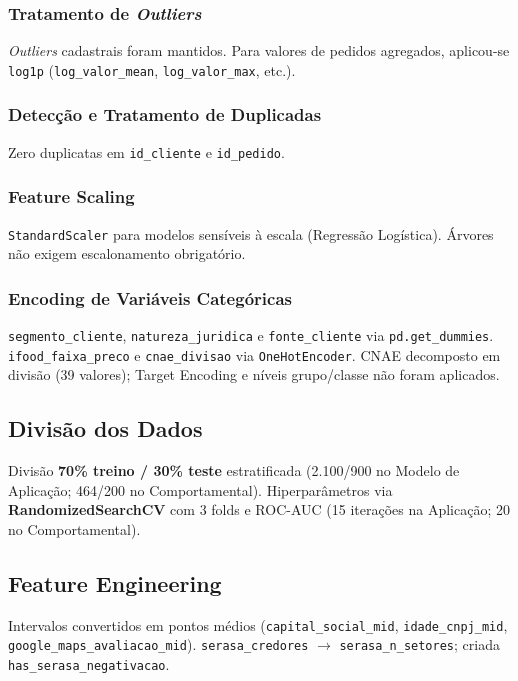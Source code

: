 \documentclass[conference]{IEEEtran}
\newcommand{\code}[1]{\texttt{#1}}
\begin{document}
\subsubsection{Tratamento de \textit{Outliers}}

\textit{Outliers} cadastrais foram mantidos. Para valores de pedidos agregados, aplicou-se \code{log1p} (\code{log\_valor\_mean}, \code{log\_valor\_max}, etc.).

\subsubsection{Detecção e Tratamento de Duplicadas}

Zero duplicatas em \code{id\_cliente} e \code{id\_pedido}.

\subsubsection{Feature Scaling}

\code{StandardScaler} para modelos sensíveis à escala (Regressão Logística). Árvores não exigem escalonamento obrigatório.

\subsubsection{Encoding de Variáveis Categóricas}

\code{segmento\_cliente}, \code{natureza\_juridica} e \code{fonte\_cliente} via \code{pd.get\_dummies}. \code{ifood\_faixa\_preco} e \code{cnae\_divisao} via \code{OneHotEncoder}. CNAE decomposto em divisão (39 valores); Target Encoding e níveis grupo/classe não foram aplicados.

\subsection{Divisão dos Dados}

Divisão \textbf{70\% treino / 30\% teste} estratificada (2.100/900 no Modelo de Aplicação; 464/200 no Comportamental). Hiperparâmetros via \textbf{RandomizedSearchCV} com 3 folds e ROC-AUC (15 iterações na Aplicação; 20 no Comportamental).

\subsection{Feature Engineering}

Intervalos convertidos em pontos médios (\code{capital\_social\_mid}, \code{idade\_cnpj\_mid}, \code{google\_maps\_avaliacao\_mid}). \code{serasa\_credores} $\rightarrow$ \code{serasa\_n\_setores}; criada \code{has\_serasa\_negativacao}.
\end{document}
